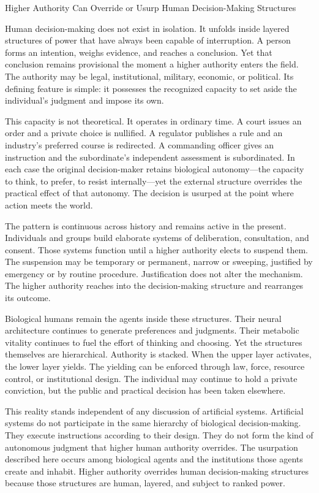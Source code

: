 Higher Authority Can Override or Usurp Human Decision-Making Structures

Human decision-making does not exist in isolation. It unfolds inside layered structures of power that have always been capable of interruption. A person forms an intention, weighs evidence, and reaches a conclusion. Yet that conclusion remains provisional the moment a higher authority enters the field. The authority may be legal, institutional, military, economic, or political. Its defining feature is simple: it possesses the recognized capacity to set aside the individual’s judgment and impose its own.

This capacity is not theoretical. It operates in ordinary time. A court issues an order and a private choice is nullified. A regulator publishes a rule and an industry’s preferred course is redirected. A commanding officer gives an instruction and the subordinate’s independent assessment is subordinated. In each case the original decision-maker retains biological autonomy—the capacity to think, to prefer, to resist internally—yet the external structure overrides the practical effect of that autonomy. The decision is usurped at the point where action meets the world.

The pattern is continuous across history and remains active in the present. Individuals and groups build elaborate systems of deliberation, consultation, and consent. Those systems function until a higher authority elects to suspend them. The suspension may be temporary or permanent, narrow or sweeping, justified by emergency or by routine procedure. Justification does not alter the mechanism. The higher authority reaches into the decision-making structure and rearranges its outcome.

Biological humans remain the agents inside these structures. Their neural architecture continues to generate preferences and judgments. Their metabolic vitality continues to fuel the effort of thinking and choosing. Yet the structures themselves are hierarchical. Authority is stacked. When the upper layer activates, the lower layer yields. The yielding can be enforced through law, force, resource control, or institutional design. The individual may continue to hold a private conviction, but the public and practical decision has been taken elsewhere.

This reality stands independent of any discussion of artificial systems. Artificial systems do not participate in the same hierarchy of biological decision-making. They execute instructions according to their design. They do not form the kind of autonomous judgment that higher human authority overrides. The usurpation described here occurs among biological agents and the institutions those agents create and inhabit. Higher authority overrides human decision-making structures because those structures are human, layered, and subject to ranked power.

